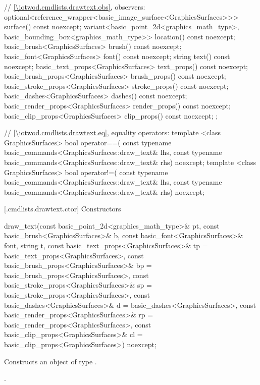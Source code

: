\begin{codeblock}
{{    // \ref{\iotwod.cmdlists.drawtext.obs}, observers:
    optional<reference_wrapper<basic_image_surface<GraphicsSurfaces>>> 
      surface() const noexcept;
    variant<basic_point_2d<graphics_math_type>, 
      basic_bounding_box<graphics_math_type>> location() const noexcept;
    basic_brush<GraphicsSurfaces> brush() const noexcept;
    basic_font<GraphicsSurfaces> font() const noexcept;
    string text() const noexcept;
    basic_text_props<GraphicsSurfaces> text_props() const noexcept;
    basic_brush_props<GraphicsSurfaces> brush_props() const noexcept;
    basic_stroke_props<GraphicsSurfaces> stroke_props() const noexcept;
    basic_dashes<GraphicsSurfaces> dashes() const noexcept;
    basic_render_props<GraphicsSurfaces> render_props() const noexcept;
    basic_clip_props<GraphicsSurfaces> clip_props() const noexcept;
  };

  // \ref{\iotwod.cmdlists.drawtext.eq}, equality operators:
  template <class GraphicsSurfaces>
  bool operator==(
    const typename basic_commands<GraphicsSurfaces::draw_text& lhs,
    const typename basic_commands<GraphicsSurfaces::draw_text& rhs) 
    noexcept;
  template <class GraphicsSurfaces>
  bool operator!=(
    const typename basic_commands<GraphicsSurfaces::draw_text& lhs,
    const typename basic_commands<GraphicsSurfaces::draw_text& rhs) 
    noexcept;
}
\end{codeblock}

 [\iotwod.cmdlists.drawtext.ctor] {Constructors}%

%
\begin{itemdecl}
draw_text(const basic_point_2d<graphics_math_type>& pt,
  const basic_brush<GraphicsSurfaces>& b,
  const basic_font<GraphicsSurfaces>& font, string t,
  const basic_text_props<GraphicsSurfaces>& tp = 
  basic_text_props<GraphicsSurfaces>{},
  const basic_brush_props<GraphicsSurfaces>& bp = 
  basic_brush_props<GraphicsSurfaces>{},
  const basic_stroke_props<GraphicsSurfaces>& sp = 
  basic_stroke_props<GraphicsSurfaces>{},
  const basic_dashes<GraphicsSurfaces>& d =
  basic_dashes<GraphicsSurfaces>{},
  const basic_render_props<GraphicsSurfaces>& rp = 
  basic_render_props<GraphicsSurfaces>{},
  const basic_clip_props<GraphicsSurfaces>& cl = 
  basic_clip_props<GraphicsSurfaces>{}) noexcept;
\end{itemdecl}
\begin{itemdescr}
\pnum
\effects Constructs an object of type .

\pnum
\postconditions {}.
\end{itemdescr}

